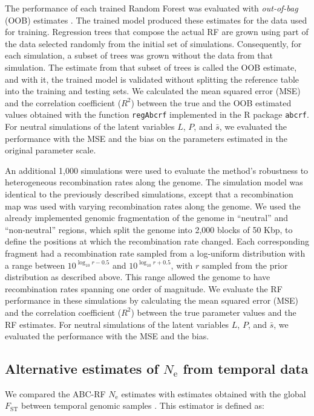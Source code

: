 \documentclass[a4paper, 12pt]{article}
\begin{document}
The performance of each trained Random Forest was evaluated with \textit{out-of-bag} (OOB) estimates \citep{Breiman:2001fb}. The trained model produced these estimates for the data used for training. Regression trees that compose the actual RF are grown using part of the data selected randomly from the initial set of simulations. Consequently, for each simulation, a subset of trees was grown without the data from that simulation. The estimate from that subset of trees is called the OOB estimate, and with it, the trained model is validated without splitting the reference table into the training and testing sets. We calculated the mean squared error (MSE) and the correlation coefficient ($R^2$) between the true and the OOB estimated values obtained with the function \texttt{regAbcrf} implemented in the R package \texttt{abcrf}. For neutral simulations of the latent variables $L$, $P$, and $\bar{s}$, we evaluated the performance with the MSE and the bias on the parameters estimated in the original parameter scale.
 
An additional 1,000 simulations were used to evaluate the method's robustness to heterogeneous recombination rates along the genome. The simulation model was identical to the previously described simulations, except that a recombination map was used with varying recombination rates along the genome. We used the already implemented genomic fragmentation of the genome in ``neutral'' and ``non-neutral'' regions, which split the genome into 2,000 blocks of 50 Kbp, to define the positions at which the recombination rate changed. Each corresponding fragment had a recombination rate sampled from a log-uniform distribution with a range between $10^{\log_{10}r - 0.5}$ and $10^{\log_{10}r + 0.5}$, with $r$ sampled from the prior distribution as described above. This range allowed the genome to have recombination rates spanning one order of magnitude. We evaluate the RF performance in these simulations by calculating the mean squared error (MSE) and the correlation coefficient ($R^2$) between the true parameter values and the RF estimates. For neutral simulations of the latent variables $L$, $P$, and $\bar{s}$, we evaluated the performance with the MSE and the bias.

\subsection*{Alternative estimates of $N_\mathrm{e}$ from temporal data}

We compared the ABC-RF $N_\mathrm{e}$ estimates with estimates obtained with the global $F_\mathrm{ST}$ between temporal genomic samples \citep{Frachon:2017fw}. This estimator is defined as:
\end{document}
